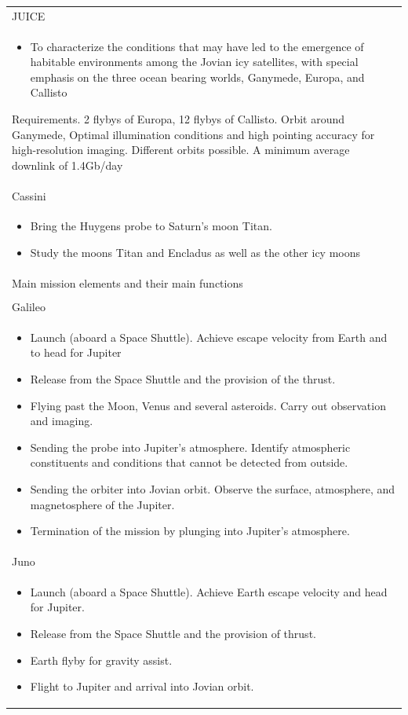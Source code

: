 \begin{supertabular}{p{\textwidth}}
  JUICE \\
  \begin{itemize}
  \item To characterize the conditions that may have led to the
    emergence of habitable environments among the Jovian icy
    satellites, with special emphasis on the three ocean bearing
    worlds, Ganymede, Europa, and Callisto
  \end{itemize}

  Requirements. 2 flybys of Europa, 12 flybys of Callisto. Orbit
  around Ganymede, Optimal illumination conditions and high pointing
  accuracy for high-resolution imaging. Different orbits possible. A
  minimum average downlink of 1.4Gb/day \\

  Cassini \\
  \begin{itemize}
  \item Bring the Huygens probe to Saturn’s moon Titan.
  \item Study the moons Titan and Encladus as well as the other icy
    moons
  \end{itemize} \\

  Main mission elements and their main functions \\ \hline \\

  Galileo \\ \begin{itemize}
  \item Launch (aboard a Space Shuttle). Achieve escape velocity from
    Earth and to head for Jupiter
  \item Release from the Space Shuttle and the provision of the
    thrust.
  \item Flying past the Moon, Venus and several asteroids. Carry out
    observation and imaging.
  \item Sending the probe into Jupiter's atmosphere. Identify
    atmospheric constituents and conditions that cannot be detected
    from outside.
  \item Sending the orbiter into Jovian orbit. Observe the surface,
    atmosphere, and magnetosphere of the Jupiter.
  \item Termination of the mission by plunging into Jupiter's
    atmosphere.
  \end{itemize} \\

  Juno \\ \begin{itemize}
  \item Launch (aboard a Space Shuttle). Achieve Earth escape velocity
    and head for Jupiter.
  \item Release from the Space Shuttle and the provision of thrust.
  \item Earth flyby for gravity assist.
  \item Flight to Jupiter and arrival into Jovian orbit.
  \end{itemize} \\


\end{supertabular}

